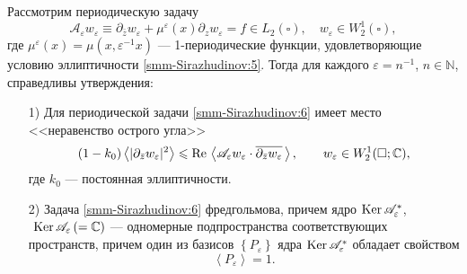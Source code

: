 	\begin{lemma}\label{smm-lem1.5}
		Рассмотрим периодическую задачу
		\begin{equation}\label{smm-Sirazhudinov:6}
			\mathscr{A}_\varepsilon w_\varepsilon\equiv
			\partial_{\bar z}w_\varepsilon+\mu^\varepsilon(x)\partial_zw_\varepsilon
			=f\in L_2(\square),\quad w_\varepsilon\in W_2^1(\square),
		\end{equation}
		где $\mu^\varepsilon(x)=\mu(x,\varepsilon^{-1}x)$ 	--- {1}-периодические функции, удовлетворяющие условию эллиптичности \eqref{smm-Sirazhudinov:5}.
		Тогда для каждого $\varepsilon=n^{-1}$, $n\in \mathbb N$, справедливы утверждения:
		\begin{enumerate}
			\item[1)] Для периодической задачи \eqref{smm-Sirazhudinov:6} имеет место <<неравенство острого угла>>
			\begin{equation}\label{smm-Sirazhudinov:7}
				(1-k_0)\left<|\partial_{\bar{z}}w_\varepsilon|^2\right>\leqslant \text{Re\,}\left<\mathscr{A}_\varepsilon w_\varepsilon\cdot \overline{\partial_{\bar{z}}w_\varepsilon}\,\right>,\qquad  w_\varepsilon\in W_2^1(\square;\mathbb{C}),
			\end{equation}
			где $k_0$ --- постоянная эллиптичности.
			\item[2)] Задача \eqref{smm-Sirazhudinov:6} фредгольмова, причем ядро  $\text{Ker\,}\mathscr{A}_\varepsilon^\ast$, $\text{ Ker\,}\mathscr{A}_\varepsilon\,(=\mathbb{C})$
			--- одномерные подпространства соответствующих пространств,
			причем один из базисов $\left\{P_\varepsilon\right\}$ ядра
			$\text{Ker\,}\mathscr{A}_\varepsilon^\ast$ обладает свойством
			\begin{equation*}%
				\left<P_\varepsilon\right>=1.
			\end{equation*}
			\end{enumerate}
	\end{lemma}
